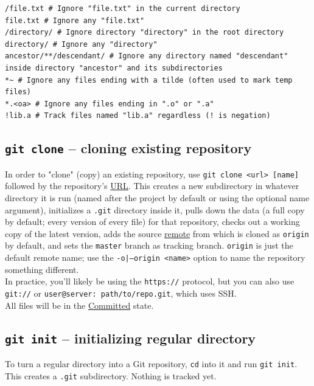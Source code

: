 \documentclass[table, xcdraw]{article}%
\begin{document}
\begin{verbatim}
/file.txt # Ignore "file.txt" in the current directory
file.txt # Ignore any "file.txt"
/directory/ # Ignore directory "directory" in the root directory
directory/ # Ignore any "directory"
ancestor/**/descendant/ # Ignore any directory named "descendant" inside directory "ancestor" and its subdirectories
*~ # Ignore any files ending with a tilde (often used to mark temp files)
*.<oa> # Ignore any files ending in ".o" or ".a"
!lib.a # Track files named "lib.a" regardless (! is negation)
\end{verbatim}

\subsection{\texttt{git clone} -- cloning existing repository}

In order to "clone" (copy) an existing repository, use \texttt{git clone <url> [name]} followed by the repository's \hyperref[protocols]{URL}. This creates a new subdirectory in whatever directory it is run (named after the project by default or using the optional name argument), initializes a \texttt{.git} directory inside it, pulls down the data (a full copy by default; every version of every file) for that repository, checks out a working copy of the latest version, adds the source \hyperref[remote]{remote} from which is cloned as \texttt{origin} by default, and sets the \texttt{master} branch as tracking branch. \texttt{origin} is just the default remote name; use the \texttt{-o|--origin <name>} option to name the repository something different. \\
In practice, you'll likely be using the \texttt{https://} protocol, but you can also use \texttt{git://} or \texttt{user@server: path/to/repo.git}, which uses SSH.\\
All files will be in the  \hyperref[states]{Committed} state.

\subsection{\texttt{git init} -- initializing regular directory} \label{init}

To turn a regular directory into a Git repository, \texttt{cd} into it and run \texttt{git init}. This creates a \texttt{.git} subdirectory. Nothing is tracked yet.
\end{document}
